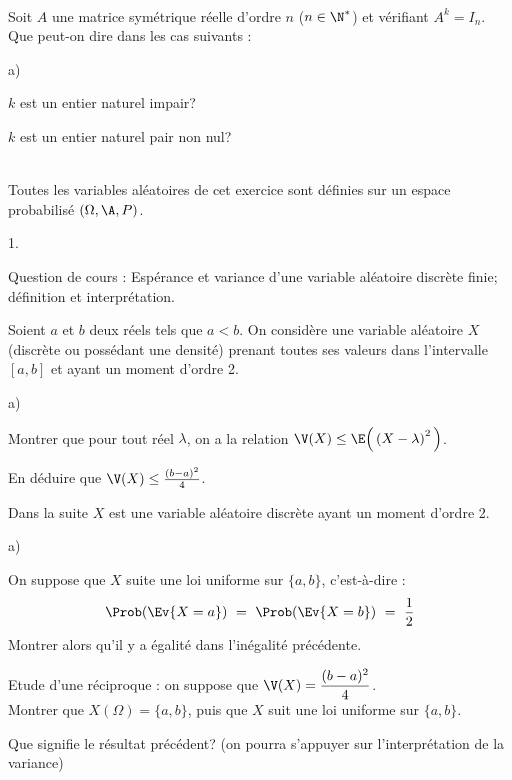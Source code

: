 \documentclass[11pt]{article}%
\begin{document}
\begin{exerciceSP}~\\
  Soit $A$ une matrice symétrique réelle d'ordre $n$ ($n \in \N^*$) et
  vérifiant $A^k = I_n$. \\
  Que peut-on dire dans les cas suivants : 
  \begin{noliste}{a)}
    \setlength{\itemsep}{2mm}
  \item $k$ est un entier naturel impair?
  \item $k$ est un entier naturel pair non nul?
  \end{noliste}
\end{exerciceSP}




\begin{exerciceAP}~\\
  Toutes les variables aléatoires de cet exercice sont définies sur un
  espace probabilisé $(\Omega , \A , P)$.
  \begin{noliste}{1.}
    \setlength{\itemsep}{2mm}
  \item Question de cours : Espérance et variance d'une variable
    aléatoire discrète finie; définition et interprétation.
  \item Soient $a$ et $b$ deux réels tels que $a < b$. On considère
    une variable aléatoire $X$ (discrète ou possédant une densité)
    prenant toutes ses valeurs dans l'intervalle $[a, b]$ et ayant un
    moment d'ordre 2.
    \begin{noliste}{a)}
    \setlength{\itemsep}{2mm} 
  \item Montrer que pour tout réel $\lambda$, on a la relation $\V(X)
    \leq \E\Big( \left(X - \lambda\right)^2 \Big)$.
    \item En déduire que $\V(X) \leq \frac{(b-a)^2}{4}$.
    \end{noliste}
  \item Dans la suite $X$ est une variable aléatoire discrète ayant un
    moment d'ordre 2.
    \begin{noliste}{a)}
    \setlength{\itemsep}{2mm} 
  \item On suppose que $X$ suite une loi uniforme sur $\{ a, b \}$,
    c'est-à-dire :
      \[
      \Prob(\Ev{X=a}) \ = \ \Prob(\Ev{X=b} ) \ = \ \frac{1}{2}
      \]
      Montrer alors qu'il y a égalité dans l'inégalité précédente.
    \item Etude d'une réciproque : on suppose que $\V(X) =
      \dfrac{(b-a)^2}{4}$.\\
      Montrer que $X(\Omega) = \{ a, b \}$, puis que $X$ suit une loi
      uniforme sur $\{ a, b \}$.
    \end{noliste}
  \item Que signifie le résultat précédent? (on pourra s'appuyer sur
    l'interprétation de la variance)
  \end{noliste}
\end{exerciceAP}
\end{document}
